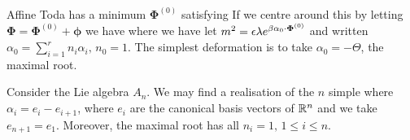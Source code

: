 \documentclass{article}
\begin{document}
Affine Toda has a minimum $\bm{\Phi}^{(0)}$ satisfying 
If we centre around this by letting $\bm{\Phi} = \bm{\Phi}^{(0)} + \bm{\phi}$ we have 
where we have let $m^2 = \epsilon \lambda e^{\beta \alpha_0 \cdot \bm{\Phi}^{(0)}}$ and written $\alpha_0 = \sum_{i=1}^r n_i \alpha_i, \, n_0=1$. The simplest deformation is to take $\alpha_0 = -\Theta$, the maximal root.  

\begin{example}
	Consider the Lie algebra $A_n$. We may find a realisation of the $n$ simple where $\alpha_i = e_i - e_{i+1}$, where $e_i$ are the canonical basis vectors of $\mathbb{R}^n$ and we take $e_{n+1}=e_1$. Moreover, the maximal root has all $n_i=1, \, 1\leq i \leq n$. 
\end{example}
\end{document}

